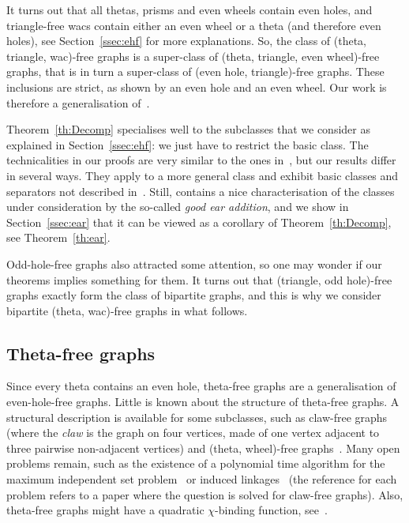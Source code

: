 \documentclass[11pt]{article}
\begin{document}
It turns out that  all thetas, prisms and even wheels contain even holes, and  triangle-free wacs contain either an even wheel or a theta (and therefore even holes), see Section~\ref{ssec:ehf} for more explanations.  
So, the class of (theta, triangle, wac)-free graphs is a super-class of (theta, triangle, even wheel)-free graphs, that is in turn a super-class of (even hole, triangle)-free graphs.
These inclusions are strict, as shown by an even hole and an even wheel. Our work is therefore a generalisation of~\cite{DBLP:journals/jgt/ConfortiCKV00}.



Theorem~\ref{th:Decomp} specialises well to  the subclasses that we consider as explained in Section~\ref{ssec:ehf}: we just have to restrict the basic class.    The technicalities in our proofs are very similar to the ones in~\cite{DBLP:journals/jgt/ConfortiCKV00}, but our results differ in several ways. 
They apply to a more general class and exhibit  basic classes and separators not described in~\cite{DBLP:journals/jgt/ConfortiCKV00}.  
Still, \cite{DBLP:journals/jgt/ConfortiCKV00} contains a nice characterisation of the classes under consideration by the so-called \emph{good ear addition}, and we show in Section~\ref{ssec:ear} that it can be viewed as a corollary of Theorem~\ref{th:Decomp}, see Theorem~\ref{th:ear}. 

Odd-hole-free graphs also attracted some attention, so one may wonder if our theorems implies something for them. It turns out that (triangle, odd hole)-free graphs exactly form the class of bipartite graphs, and this is why we consider bipartite (theta, wac)-free graphs in what follows. 


\subsection*{Theta-free graphs}

Since every theta contains an even hole, theta-free graphs are a generalisation of even-hole-free graphs.     
Little is known about the structure of theta-free graphs. 
A structural description is available for some subclasses, such as claw-free graphs~\cite{DBLP:conf/bcc/ChudnovskyS05} (where the \emph{claw} is the graph on four vertices, made of one vertex adjacent to three pairwise non-adjacent vertices) and (theta, wheel)-free graphs~\cite{diotRaTrVu:15,RaTrVu:partII,RaTrVu:partIII,RaTrVu:partIV}.  
Many open problems remain, such as the existence of a polynomial time algorithm for the maximum independent set problem~\cite{DBLP:journals/jacm/FaenzaOS14} or induced linkages~\cite{fialaKLP:12}
(the reference for each problem refers to a paper where the question is solved for claw-free graphs).  Also, theta-free graphs might have a quadratic $\chi$-binding function, see~\cite{Bourneuf2024On}. 
\end{document}
